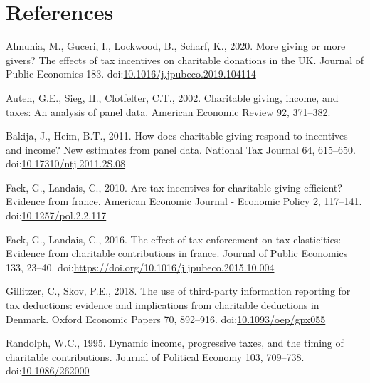 \documentclass[
  11pt,
  a4paper,
]{article}
\newlength{\cslhangindent}
\newlength{\cslentryspacingunit} %
\newenvironment{CSLReferences}[2] %
 {%
  \setlength{\parindent}{0pt}
  \ifodd #1
  \let\oldpar\par
  \def\par{\hangindent=\cslhangindent\oldpar}
  \fi
  \setlength{\parskip}{#2\cslentryspacingunit}
 }%
 {}
\newlength{\cslhangindent}
\newenvironment{CSLReferences}[2] %
 {%
  \setlength{\parindent}{0pt}
  \ifodd #1 \everypar{\setlength{\hangindent}{\cslhangindent}}\ignorespaces\fi
  \ifnum #2 > 0
  \setlength{\parskip}{#2\baselineskip}
  \fi
 }%
 {}
\begin{document}
\clearpage

\hypertarget{references}{%
\section*{References}\label{references}}

\hypertarget{refs}{}
\begin{CSLReferences}{1}{0}
\leavevmode{}%
Almunia, M., Guceri, I., Lockwood, B., Scharf, K., 2020. More giving or more givers? The effects of tax incentives on charitable donations in the UK. Journal of Public Economics 183. doi:\href{https://doi.org/10.1016/j.jpubeco.2019.104114}{10.1016/j.jpubeco.2019.104114}

\leavevmode{}%
Auten, G.E., Sieg, H., Clotfelter, C.T., 2002. Charitable giving, income, and taxes: An analysis of panel data. American Economic Review 92, 371--382.

\leavevmode{}%
Bakija, J., Heim, B.T., 2011. How does charitable giving respond to incentives and income? New estimates from panel data. National Tax Journal 64, 615--650. doi:\href{https://doi.org/10.17310/ntj.2011.2S.08}{10.17310/ntj.2011.2S.08}

\leavevmode{}%
Fack, G., Landais, C., 2010. Are tax incentives for charitable giving efficient? Evidence from france. American Economic Journal - Economic Policy 2, 117--141. doi:\href{https://doi.org/10.1257/pol.2.2.117}{10.1257/pol.2.2.117}

\leavevmode{}%
Fack, G., Landais, C., 2016. The effect of tax enforcement on tax elasticities: Evidence from charitable contributions in france. Journal of Public Economics 133, 23--40. doi:\url{https://doi.org/10.1016/j.jpubeco.2015.10.004}

\leavevmode{}%
Gillitzer, C., Skov, P.E., 2018. {The use of third-party information reporting for tax deductions: evidence and implications from charitable deductions in Denmark}. Oxford Economic Papers 70, 892--916. doi:\href{https://doi.org/10.1093/oep/gpx055}{10.1093/oep/gpx055}

\leavevmode{}%
Randolph, W.C., 1995. Dynamic income, progressive taxes, and the timing of charitable contributions. Journal of Political Economy 103, 709--738. doi:\href{https://doi.org/10.1086/262000}{10.1086/262000}


\end{CSLReferences}
\end{document}
